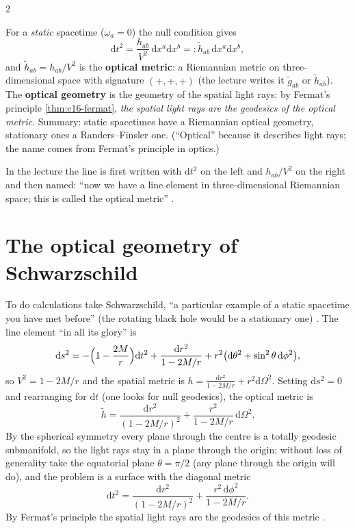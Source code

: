 \begin{paracol}{2}
\begin{definition}\label{def:c16-optical}
For a \emph{static} spacetime ($\omega_a=0$) the null condition gives
\[
  \mathrm dt^2=\frac{h_{ab}}{V^2}\,\mathrm dx^a\mathrm dx^b=:\tilde h_{ab}\,\mathrm dx^a\mathrm dx^b,
\]
and $\tilde h_{ab}=h_{ab}/V^2$ is the \textbf{optical metric}: a Riemannian metric on three-dimensional space with signature $(+,+,+)$ (the lecture writes it $\tilde g_{ab}$ or $\tilde h_{ab}$). The \textbf{optical geometry} is the geometry of the spatial light rays: by Fermat's principle \cref{thm:c16-fermat}, \emph{the spatial light rays are the geodesics of the optical metric}. Summary: static spacetimes have a Riemannian optical geometry, stationary ones a Randers--Finsler one. (``Optical'' because it describes light rays; the name comes from Fermat's principle in optics.)
\end{definition}
In the lecture the line is first written with $\mathrm dt^2$ on the left and $h_{ab}/V^2$ on the right and then named: ``now we have a line element in three-dimensional Riemannian space; this is called the optical metric'' .

\section{The optical geometry of Schwarzschild}\label{sec:c16-schwarz}

To do calculations take Schwarzschild, ``a particular example of a static spacetime you have met before'' (the rotating black hole would be a stationary one) . The line element ``in all its glory'' is
\[
  \mathrm ds^2=-\Bigl(1-\frac{2M}{r}\Bigr)\mathrm dt^2+\frac{\mathrm dr^2}{1-2M/r}+r^2\bigl(\mathrm d\theta^2+\sin^2\theta\,\mathrm d\phi^2\bigr),
\]
so $V^2=1-2M/r$ and the spatial metric is $h=\frac{\mathrm dr^2}{1-2M/r}+r^2\mathrm d\Omega^2$. Setting $\mathrm ds^2=0$ and rearranging for $\mathrm dt$ (one looks for null geodesics), the optical metric is
\[
  \tilde h=\frac{\mathrm dr^2}{(1-2M/r)^2}+\frac{r^2}{1-2M/r}\,\mathrm d\Omega^2.
\]
By the spherical symmetry every plane through the centre is a totally geodesic submanifold, so the light rays stay in a plane through the origin; without loss of generality take the equatorial plane $\theta=\pi/2$ (any plane through the origin will do), and the problem is a surface with the diagonal metric
\begin{equation}\label{eq:c16-opt}
  \mathrm dt^2=\frac{\mathrm dr^2}{(1-2M/r)^2}+\frac{r^2\,\mathrm d\phi^2}{1-2M/r}.
\end{equation}
By Fermat's principle the spatial light rays are the geodesics of this metric .


\end{paracol}
